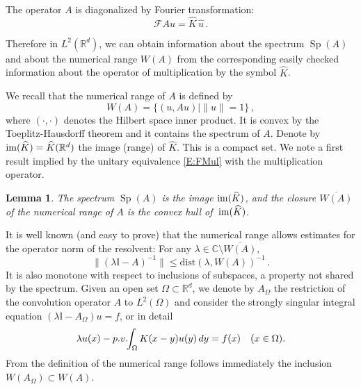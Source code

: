 \documentclass[12pt]{amsart}
\newtheorem{lemma}[theorem]{Lemma}
\theoremstyle{definition}
\theoremstyle{remark}
\numberwithin{equation}{section}
\newcommand{\pv}{\mathop{\rm p.v.}}
\newcommand{\im}{\operatorname{\rm im}}
\newcommand\C{{\mathbb C}}
\newcommand\R{{\mathbb R}}
\newcommand{\sF}{{\mathscr F}}
\newcommand {\Id}{\mathbb I}
\newcommand{\dist}{\mathrm{dist}}
\newcommand{\Sp}{\mathop{\mathrm{Sp}}\nolimits}
\let\hat=\widehat
\begin{document}
The operator $A$ is diagonalized by Fourier transformation:
\begin{equation}
\label{E:FMul}
\sF Au = \hat K \,\hat u\,.
\end{equation}

Therefore in $L^{2}(\R^{d})$, we can obtain information about the spectrum $\Sp(A)$ and about the numerical range $W(A)$  from the corresponding easily checked information about the operator of multiplication by the symbol $\hat K$. 

We recall that the numerical range of $A$ is defined by
 $$
  W(A) = \{(u,Au) \mid \|u\|=1\}\,,
$$
where $(\cdot,\cdot)$ denotes the Hilbert space inner product. It is convex by the Toeplitz-Hausdorff theorem and it contains the spectrum of $A$.
Denote by $\im(\hat K)=\hat K(\R^{d})$ the image (range)  of $\hat K$. This is a compact set.
We note a first result implied by the unitary equivalence \eqref{E:FMul} with the multiplication operator.
\begin{lemma}
 \label{L:Sp+W(A)}
 The spectrum $\Sp(A)$ is the image $\im(\hat K)$, and the closure $\overline{W(A)}$ of the numerical range of $A$ is the convex hull of $\,\im(\hat K)$.
\end{lemma}

It is well known (and easy to prove) that the numerical range allows estimates for the operator norm of the resolvent: For any 
$\lambda\in\C\setminus\overline{W(A)}$,
$$
 \|(\lambda\Id-A)^{-1}\| \le \dist(\lambda,W(A))^{-1}\,.
$$
It is also monotone with respect to inclusions of subspaces, a property not shared by the spectrum. Given an open set $\Omega\subset\R^{d}$, we denote by $A_{\Omega}$ the restriction of the convolution operator $A$ to $L^{2}(\Omega)$ and consider the strongly singular integral equation $(\lambda \Id -A_{\Omega})u=f$, or in detail
\begin{equation}
\label{E:SIE}
\lambda u(x) - \pv\!\! \int_{\Omega}K(x-y) u(y)\,dy = f(x)\quad (x\in\Omega).
\end{equation}
From the definition of the numerical range follows immediately the inclusion
$W(A_{\Omega})\subset W(A)$. 
\end{document}
